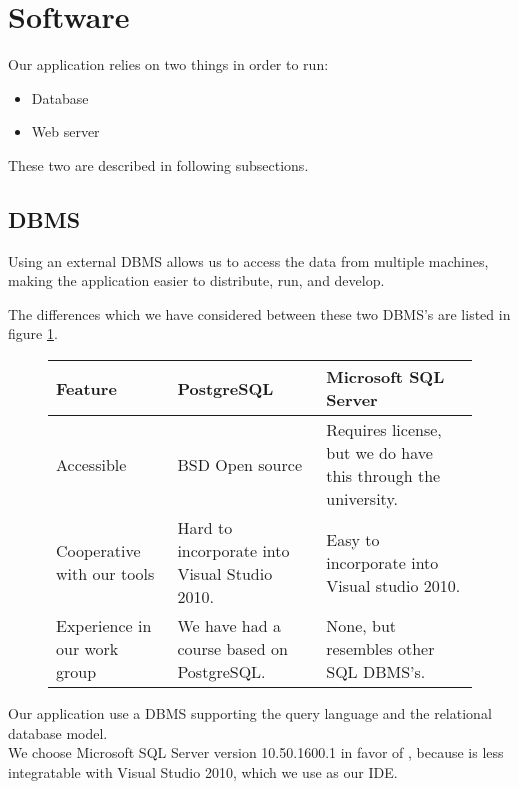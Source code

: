 \section{Software}
\label{sec:software}

Our application relies on two things in order to run:

\begin{itemize}
	\item Database
	\item Web server
\end{itemize}

These two are described in following subsections.

\subsection{DBMS}
\label{subsec:dbms}

Using an external DBMS allows us to access the data from multiple machines, making the application easier to distribute, run, and develop.

The differences which we have considered between these two DBMS's are listed in figure \ref{fig:DBMS}. \cite{postgres08}

\begin{figure}[p]
	\centering
		\begin{tabularx}{\textwidth}{L|L|L}
			\textbf{Feature}&\textbf{PostgreSQL}&\textbf{Microsoft SQL Server} \\
			\hline
			Accessible&BSD Open source&Requires license, but we do have this through the university. \\ 
			Cooperative with our tools&Hard to incorporate into Visual Studio 2010. & Easy to incorporate into Visual studio 2010. \\ 
			Experience in our work group&We have had a course based on PostgreSQL. & None, but resembles other SQL DBMS's. \\ 
		\end{tabularx}
	\label{fig:DBMS}
\end{figure}

Our application use a DBMS supporting the query language \sql[] and the relational database model. \cite{Sudershan2011} \\
We choose Microsoft SQL Server version 10.50.1600.1 in favor of \posgresql[], because \posgresql[] is less integratable with Visual Studio 2010, which we use as our IDE.

